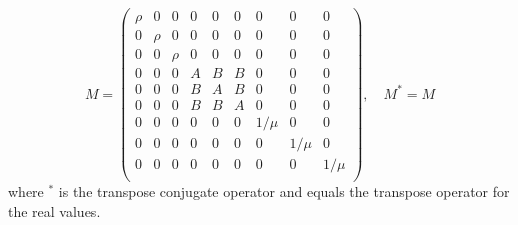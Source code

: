 \documentclass[pdftex,a4paper,parskip,listof=totoc,bibliography=totoc,onehalfspacing,12pt]{scrreprt}
\begin{document}
\begin{equation}
M=
 \begin{pmatrix}
   \rho       & 0         & 0         & 0         & 0         & 0         & 0         & 0         & 0       \\
   0          & \rho      & 0         & 0         & 0         & 0         & 0         & 0         & 0        \\
   0          & 0         & \rho      & 0         & 0         & 0         & 0         & 0         & 0        \\
   0          & 0         & 0         & A         & B         & B         & 0         & 0         & 0        \\
   0          & 0         & 0         & B         & A         & B         & 0         & 0         & 0        \\
   0          & 0         & 0         & B         & B         & A         & 0         & 0         & 0        \\
   0          & 0         & 0         & 0         & 0         & 0         & 1/\mu      & 0         & 0        \\
   0          & 0         & 0         & 0         & 0         & 0         & 0         & 1/\mu      & 0        \\
   0          & 0         & 0         & 0         & 0         & 0         & 0         & 0         & 1/\mu     \\
 \end{pmatrix}, \quad M^{*}=M
\end{equation}
where $^{*}$ is the transpose conjugate operator and equals the transpose operator for the real values.
\end{document}
